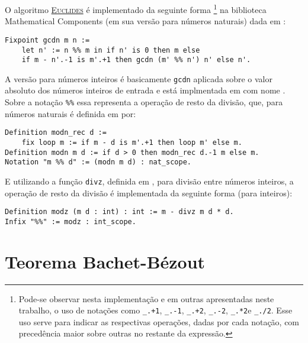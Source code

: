 O algoritmo \hyperref[algo:euclides]{\textsc{Euclides}} é implementado da seguinte forma \footnote{Pode-se observar nesta implementação e em outras apresentadas neste trabalho, o uso de notações como \codequotes\lstinline[language=coq-error]|_.+1|\codequotes, \codequotes\lstinline[language=coq]|_.-1|\codequotes, \codequotes\lstinline[language=coq]|_.+2|\codequotes, \codequotes\lstinline[language=coq]|_.-2|\codequotes, \codequotes\lstinline[language=coq]|_.*2|\codequotes\;e \codequotes\lstinline[language=coq]|_./2|\codequotes. Esse uso serve para indicar as respectivas operações, dadas por cada notação, com precedência maior sobre outras no restante da expressão.} na biblioteca Mathematical Components (em sua versão para números naturais) dada em \cite{mathcomp-div}:
    \begin{lstlisting}[language=coq,frame=single,tabsize=1]
Fixpoint gcdn m n :=
    let n' := n %% m in if n' is 0 then m else
    if m - n'.-1 is m'.+1 then gcdn (m' %% n') n' else n'.
    \end{lstlisting}
A versão para números inteiros é basicamente \lstinline[language = coq]{gcdn} aplicada sobre o valor absoluto dos números inteiros de entrada e está implmentada em \cite{mathcomp-intdiv} com nome .
Sobre a notação \lstinline[language = coq]{%%} essa representa a operação de resto da divisão, que, para números naturais é definida em \cite{mathcomp-div} por:
    \begin{lstlisting}[language=coq,frame=single,tabsize=1]
Definition modn_rec d := 
    fix loop m := if m - d is m'.+1 then loop m' else m.
Definition modn m d := if d > 0 then modn_rec d.-1 m else m.
Notation "m %% d" := (modn m d) : nat_scope.
    \end{lstlisting}
E utilizando a função 
\lstinline[language = coq]{divz}, definida em \cite{mathcomp-intdiv}, para divisão entre números inteiros, a operação de resto da divisão é implementada da seguinte forma (para inteiros):
    \begin{lstlisting}[language=coq,frame=single,tabsize=1]
Definition modz (m d : int) : int := m - divz m d * d.
Infix "%%" := modz : int_scope.
    \end{lstlisting}

\section{Teorema Bachet-Bézout}


